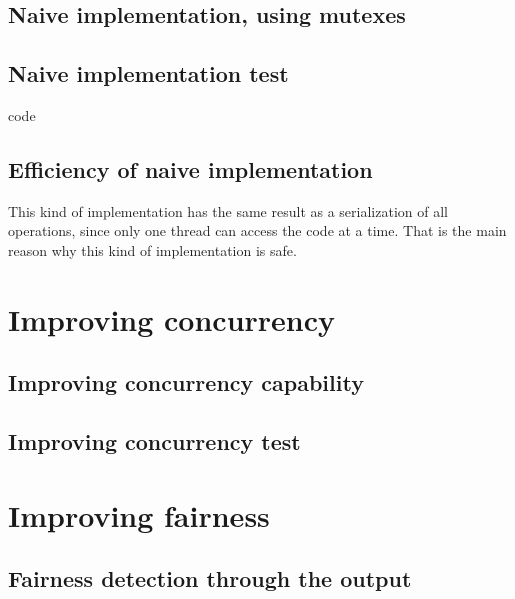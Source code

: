 \documentclass{article}
\begin{document}
	\subsection{Naive implementation, using mutexes}

		

	\subsection{Naive implementation test}

		code

	\subsection{Efficiency of naive implementation}

		This kind of implementation has the same result as a serialization of all operations, since 
		only one thread can access the code at a time. That is the main reason why this kind of 
		implementation is safe.

\section{Improving concurrency}

	\subsection{Improving concurrency capability}

		

	\subsection{Improving concurrency test}

		

\section{Improving fairness}	

	\subsection{Fairness detection through the output}
		
\end{document}
